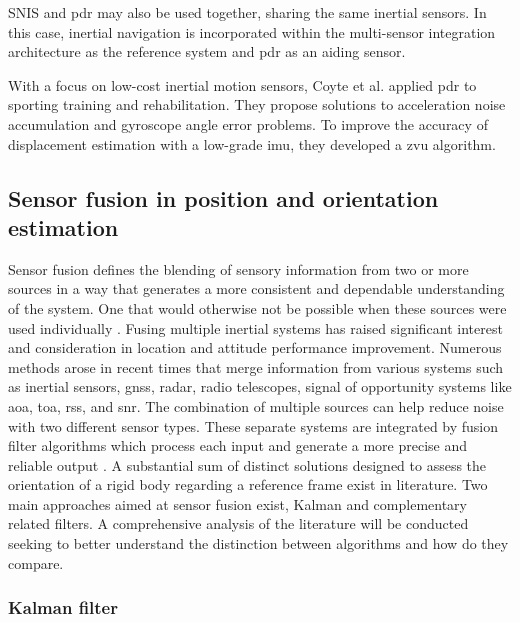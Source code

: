 SNIS and \acrshort{pdr} may also be used together, sharing the same inertial sensors. In this case, inertial navigation is incorporated within the multi-sensor integration architecture as the reference system and \acrshort{pdr} as an aiding sensor.


With a focus on low-cost inertial motion sensors, Coyte et al. \cite{coyte2013displacement} applied \acrshort{pdr} to sporting training and rehabilitation. They propose solutions to acceleration noise accumulation and gyroscope angle error problems. To improve the accuracy of displacement estimation with a low-grade \acrshort{imu}, they developed a \acrshort{zvu} algorithm.

\subsection{Sensor fusion in position and orientation estimation }

Sensor fusion defines the blending of sensory information from two or more sources in a way that generates a more consistent and dependable understanding of the system. One that would otherwise not be possible when these sources were used individually \cite{hall1997introduction}. Fusing multiple inertial systems has raised significant interest and consideration in location and attitude performance improvement. Numerous methods arose in recent times that merge information from various systems such as inertial sensors, \acrshort{gnss}, radar, radio telescopes, signal of opportunity systems like \acrfull{aoa}, \acrfull{toa}, \acrfull{rss}, and \acrfull{snr}. The combination of multiple sources can help reduce noise with two different sensor types. These separate systems are integrated by fusion filter algorithms which process each input and generate a more precise and reliable output \cite{elmenreich2002introduction}. A substantial sum of distinct solutions designed to assess the orientation of a rigid body regarding a reference frame exist in literature. Two main approaches aimed at sensor fusion exist, Kalman and complementary related filters. A comprehensive analysis of the literature will be conducted seeking to better understand the distinction between algorithms and how do they compare.

\subsubsection{Kalman filter}

